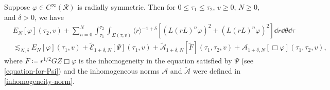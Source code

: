 \documentclass[10pt, reqno]{amsart}
\begin{document}
\begin{proposition}
Suppose \(\varphi{}\in C^\infty(\mathcal{R})\) is radially symmetric. Then for \(0\le \tau_1\le \tau_2\),
\(v\ge 0\), \(N\ge 0\), and \(\delta{} > 0\), we have
\begin{equation}\label{T-estimate-ho-equation}
\begin{split}
&E_N[\varphi{}](\tau{}_2,v) + \sum_{n=0}^N\int_{\tau{}_1}^{\tau{}_2} \int _{\Sigma{}(\tau{},v)} \langle{}r\rangle{}^{-1+\delta{}}[(L(rL)^n\varphi{})^2 + (\underline{L}(rL)^n\varphi{})^2]\dd{}r\dd{}\theta{}\dd{}\tau{} \\
&\lesssim_{N,\delta{}} E_N[\varphi{}](\tau{}_1,v) + \tilde{\mathcal{E}}_{1+\delta{},N}[\Psi{}](\tau{}_1,v) + \tilde{\mathcal{A}}_{1+\delta{},N}[\tilde{F}](\tau{}_1,\tau{}_2,v) + \mathcal{A}_{1+\delta{},N}[\Box{}\varphi{}](\tau{}_1,\tau{}_2,v),
\end{split}
\end{equation}
where \(\tilde{F} \coloneqq{} r^{1/2}GZ\Box{}\varphi{}\) is the inhomogeneity in the equation
satisfied by \(\Psi{}\) (see \cref{equation-for-Psi}) and the inhomogeneous norms
\(\mathcal{A}\) and \(\tilde{\mathcal{A}}\) were defined in
\cref{inhomogeneity-norm}.
\label{T-estimate-ho}
\end{proposition}
\end{document}

